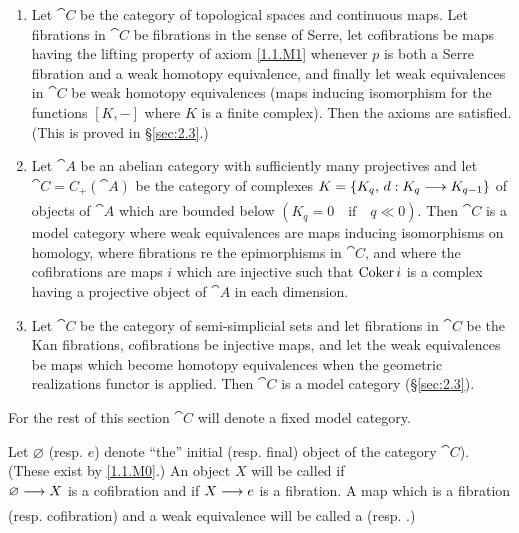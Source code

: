 \documentclass[../main]{subfiles}
\begin{document}
\begin{examples}

\begin{enumerate}[label = \Alph*.]

\item\label{ex:1.1.A} Let $\cat{C}$ be the category of topological spaces and continuous maps. Let fibrations in $\cat{C}$ be fibrations in the sense of Serre, let cofibrations be maps having the lifting property of axiom \ref{1.1.M1} whenever $p$ is both a Serre fibration and a weak homotopy equivalence, and finally let weak equivalences in $\cat{C}$ be weak homotopy equivalences (maps inducing isomorphism for the functions $[K,-]$ where $K$ is a finite complex). Then the axioms are satisfied. (This is proved in \S\ref{sec:2.3}.)

\item\label{ex:1.1.B} Let $\cat{A}$ be an abelian category with sufficiently many projectives and let $\cat{C}=C_+(\cat{A})$ be the category of complexes $K=\{K_q,\, d:K_q\varrightarrow{}K_{q-1}\}$ of objects of $\cat{A}$ which are bounded below $(K_q=0 \quad \text{if}\quad q\ll 0)$. Then $\cat{C}$ is a model category where weak equivalences are maps inducing isomorphisms on homology, where fibrations re the epimorphisms in $\cat{C}$, and where the cofibrations are maps $i$ which are injective such that $\operatorname{Coker} i$ is a complex having a projective object of $\cat{A}$ in each dimension.

\item\label{ex:1.1.C} Let $\cat{C}$ be the category of semi-simplicial sets and let fibrations in $\cat{C}$ be the Kan fibrations, cofibrations be injective maps, and let the weak equivalences be maps which become homotopy equivalences when the geometric realizations functor is applied. Then $\cat{C}$ is a model category (\S\ref{sec:2.3}).

\end{enumerate}

\end{examples}

For the rest of this section $\cat{C}$ will denote a fixed model category.

\begin{definition}\label{def:1.1.2}
	Let $\varnothing$ (resp. $e$) denote ``the'' initial (resp. final) object of the category $\cat{C}$). (These exist by \ref{1.1.M0}.) An object $X$ will be called  if \\ $\varnothing \varrightarrow{} X$ is a cofibration and  if $X\varrightarrow{} e$ is a fibration. A map which is a fibration (resp. cofibration) and a weak equivalence will be called a  (resp. .)
\end{definition}
\end{document}

